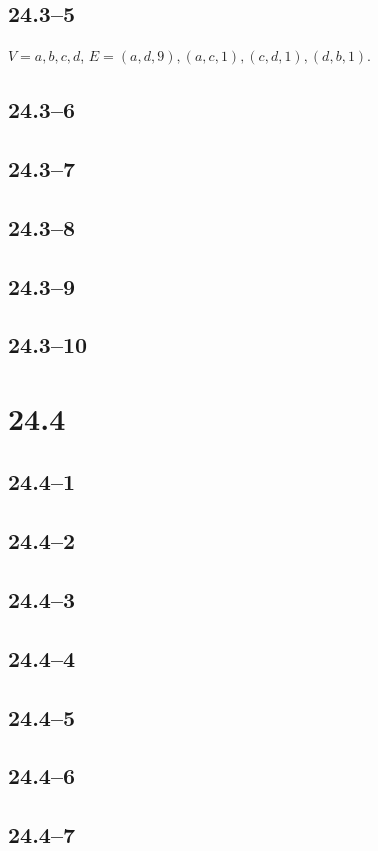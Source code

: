 \documentclass{article}
\begin{document}
\subsection*{24.3--5}
$V = {a, b, c, d}$, $E = {(a, d, 9), (a, c, 1), (c, d, 1), (d, b, 1)}$.

\subsection*{24.3--6}

\subsection*{24.3--7}
\subsection*{24.3--8}
\subsection*{24.3--9}
\subsection*{24.3--10}

\section*{24.4}
\subsection{24.4--1}
\subsection{24.4--2}
\subsection{24.4--3}
\subsection{24.4--4}
\subsection{24.4--5}
\subsection{24.4--6}
\subsection{24.4--7}
\end{document}
